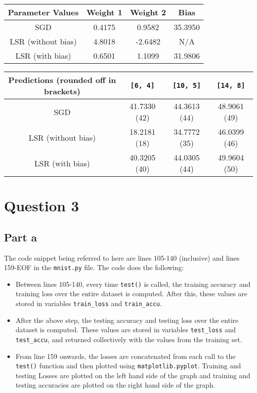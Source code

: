 \documentclass{article}
\begin{document}
\begin{center}
\begin{tabular}{|c|c|c|c|}
\hline
\textbf{Parameter Values} & \textbf{Weight 1} & \textbf{Weight 2} & \textbf{Bias} \\
\hline
SGD & 0.4175 & 0.9582 & 35.3950 \\
\hline
LSR (without bias) & 4.8018 & -2.6482 & N/A \\
\hline
LSR (with bias) & 0.6501 & 1.1099 & 31.9806 \\
\hline
\end{tabular}

\begin{tabular}{|c|c|c|c|}
\hline
\textbf{Predictions (rounded off in brackets)} & \texttt{[6, 4]} & \texttt{[10, 5]} & \texttt{[14, 8]} \\
\hline
SGD & 41.7330 (42) & 44.3613 (44) & 48.9061 (49) \\
\hline
LSR (without bias) & 18.2181 (18) & 34.7772 (35) & 46.0399 (46) \\
\hline
LSR (with bias) & 40.3205 (40) & 44.0305 (44) & 49.9604 (50) \\
\hline
\end{tabular}
\end{center}

\section*{Question 3}
\subsection*{Part a}
\begin{flushleft}
The code snippet being referred to here are lines 105-140 (inclusive) and lines 159-EOF in the \texttt{mnist.py} file. The code does the following:
\begin{itemize}
\item Between lines 105-140, every time \texttt{test()} is called, the training accuracy and training loss over the entire dataset is computed. After this, these values are stored in variables \texttt{train\_loss} and \texttt{train\_accu}.
\item After the above step, the testing accuracy and testing loss over the entire dataset is computed. These values are stored in variables \texttt{test\_loss} and \texttt{test\_accu}, and returned collectively with the values from the training set.
\item From line 159 onwards, the losses are concatenated from each call to the \texttt{test()} function and then plotted using \texttt{matplotlib.pyplot}. Training and testing Losses are plotted on the left hand side of the graph and training and testing accuracies are plotted on the right hand side of the graph.
\end{itemize}
\end{flushleft}
\end{document}

